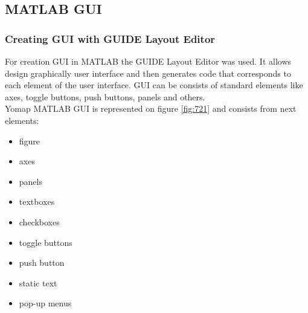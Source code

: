 	\subsection{MATLAB GUI}
	
		\subsubsection{Creating GUI with GUIDE Layout Editor}
			For creation GUI in MATLAB the GUIDE Layout Editor was used. It allows design graphically user interface and then generates code that corresponds to each element of the user interface. GUI can be consists of standard elements like axes, toggle buttons, push buttons, panels and others.\\
			
			Yomap MATLAB GUI is represented on figure \ref{fig:721} and consists from next elements:
			\begin{itemize}
				\item figure
				\item axes
				\item panels
				\item textboxes
				\item checkboxes
				\item toggle buttons
				\item push button
				\item static text
				\item pop-up menus
			\end{itemize}
			
